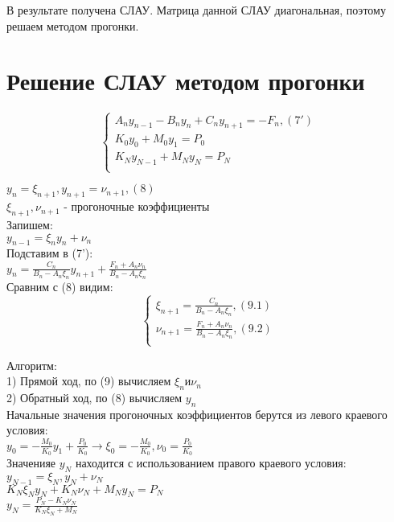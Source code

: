 В результате получена СЛАУ. Матрица данной СЛАУ диагональная, поэтому решаем методом прогонки.

\section{Решение СЛАУ методом прогонки}
\begin{equation}
\begin{cases}
A_{n} y_{n-1} - B_{n}y_{n} + C_{n}y_{n+1} = -F_{n}, (7')\\
K_{0} y_{0} + M_{0} y_{1} = P_{0}\\
K_{N} y_{N - 1} + M_{N} y_{N} = P_{N}\\
\end{cases}
\end{equation}

$y_{n} = \xi_{n+1}, y_{n+1} = \nu_{n+1}, (8)$\\
$\xi_{n+1}, \nu_{n+1}$ - прогоночные коэффициенты\\
Запишем:\\
$y_{n-1} = \xi_{n} y_{n} + \nu_{n}$\\
Подставим в (7'):\\
$y_{n} = \frac{C_{n}}{B_{n} - A_{n}\xi_{n}} y_{n+1} + \frac{F_{n} + A_{n} \nu_{n}}{B_{n} - A_{n} \xi_{n}}$\\
Сравним с (8) видим:\\
\begin{equation}
\begin{cases}
\xi_{n+1} = \frac{C_{n}}{B_{n} - A_{n} \xi_{n}}, (9.1)\\
\nu_{n+1} = \frac{F_{n} + A_{n} \nu_{n}}{B_{n} - A_{n} \xi_{n}}, (9.2)\\
\end{cases}
\end{equation}

Алгоритм:\\
1) Прямой ход, по (9) вычисляем $\xi_{n} и \nu_{n}$\\
2) Обратный ход, по (8) вычисляем $y_{n}$\\

Начальные значения прогоночных коэффициентов берутся из левого краевого условия:\\
$y_{0} = -\frac{M_{0}}{K_{0}} y_{1} + \frac{P_{0}}{K_{0}} \rightarrow \xi_{0} = -\frac{M_{0}}{K_{0}}, \nu_{0} = \frac{P_{0}}{K_{0}}$\\

Значенияе $y_{N}$ находится с использованием правого краевого условия:\\
$y_{N - 1}  = \xi_{N}, y_{N} + \nu_{N}$\\
$K_{N} \xi_{N} y_{N} + K_{N} \nu_{N} + M_{N} y_{N} = P_{N}$\\
$y_{N} = \frac{P_{N} - K_{N} \nu_{N}}{K_{N} \xi_{N} + M_{N}}$\\



